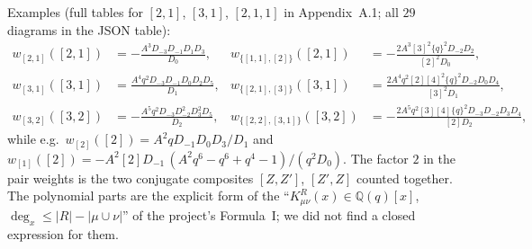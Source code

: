 \documentclass[11pt]{article}
\begin{document}
Examples (full tables for $[2,1]$, $[3,1]$, $[2,1,1]$ in Appendix~A.1; all $29$ diagrams in the JSON table):
\begin{align*}
w_{[2,1]}([2,1])&=-\frac{A^3D_{-3}D_{-1}D_1D_3}{D_0}, &
w_{\{[1,1],[2]\}}([2,1])&=-\frac{2A^3[3]^2\{q\}^2D_{-2}D_2}{[2]^2D_0},\\
w_{[3,1]}([3,1])&=\frac{A^4q^2D_{-3}D_{-1}D_0D_2D_5}{D_1}, &
w_{\{[2,1],[3]\}}([3,1])&=\frac{2A^4q^2[2][4]^2\{q\}^2D_{-2}D_0D_4}{[3]^2D_1},\\
w_{[3,2]}([3,2])&=-\frac{A^5q^2D_{-3}D_{-2}^2D_3^2D_5}{D_2}, &
w_{\{[2,2],[3,1]\}}([3,2])&=-\frac{2A^5q^2[3][4]\{q\}^2D_{-3}D_{-2}D_3D_4}{[2]D_2},
\end{align*}
while e.g.\ $w_{[2]}([2])=A^2qD_{-1}D_0D_3/D_1$ and
$w_{[1]}([2])=-A^2[2]D_{-1}\,(A^2q^6-q^6+q^4-1)/(q^2D_0)$.
The factor $2$ in the pair weights is the two conjugate composites $[Z,Z']$, $[Z',Z]$ counted together.  The
polynomial parts are the explicit form of the ``$K^R_{\mu\nu}(x)\in\mathbb Q(q)[x]$, $\deg_x\le|R|-|\mu\cup\nu|$'' of
the project's Formula~I; we did not find a closed expression for them.
\end{document}
